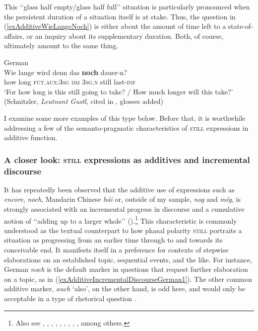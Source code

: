 This \lq\lq glass half empty/glass half full\rq\rq{ }situation is particularly pronounced when the persistent duration of a situation itself is at stake. Thus, the question in (\ref{exAdditiveWieLangeNoch}) is either about the amount of time left to a state-of-affairs, or an inquiry about its supplementary duration. Both, of course, ultimately amount to the same thing.

\begin{exe}
	\ex German\label{exAdditiveWieLangeNoch}\\
	\gll Wie lange wird denn das \textbf{noch} dauer-n?\\
	how long \textsc{fut}.\textsc{aux}:3\textsc{sg} \textsc{dm} 3\textsc{sg}.\textsc{n} still last-\textsc{inf}\\
	\glt \lq For how long is this still going to take? / How much longer will this take?\rq{ }(Schnitzler, \textit{Leutnant Gustl}, cited in \cite[60]{Shetter1966}, glosses added)
\end{exe}

I examine some more examples of this type below. Before that, it is worthwhile addressing a few of the semanto-pragmatic characteristics of \textsc{still} expressions in additive function.

\subsubsection{A closer look: \textsc{still} expressions as additives and incremental discourse} It has repeatedly been observed that the additive use of expressions such as  \textit{encore}, \textit{noch}, Mandarin Chinese \textit{hái} or, outside of my sample,  \textit{nog} and  \textit{még}, is strongly associated with an incremental progress in discourse and a cumulative notion of \lq\lq adding up to a larger whole\rq\rq{ }(\cite[146]{Koenig1991}).\footnote{Also see \textcite{Borillo1984}, \textcite{Eckardt2006}, \textcite{Grubic2018}, \textcite[156–158]{MosegaardHansen2008}, \textcite[100–107]{Nederstigt2003}, \textcite[141]{Noelke1983}, \textcite{Umbach2012}, \textcite{Vandeweghe1984}, \textcite{ZhangLing2016}, among others.} This characteristic is commonly understood as the textual counterpart to how phasal polarity \textsc{still} portraits a situation as progressing from an earlier time through to  and towards its conceivable end. It manifests itself in a preference for contexts of stepwise elaborations on an established topic, sequential events, and the like. For instance, German \textit{noch} is the default marker in questions that request further elaboration on a topic, as in (\ref{exAdditiveIncrementalDiscourseGerman1}). The other common additive marker, \textit{auch} \lq also\rq{}, on the other hand, is odd here, and would only be acceptable in a type of rhetorical question \parencite{Umbach2012}.


